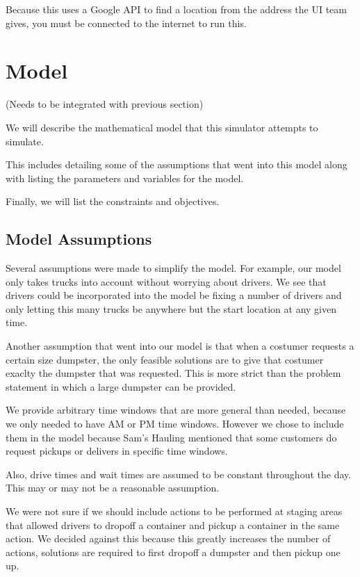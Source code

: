 \documentclass{article}
\begin{document}
Because this uses a Google API to find a location from the address the UI team gives, you must be connected to the internet to run this.

\section{Model}

(Needs to be integrated with previous section)


We will describe the mathematical model that this simulator attempts to simulate.

This includes detailing some of the assumptions that went into this model along with listing the parameters and variables for the model.

Finally, we will list the constraints and objectives.

\subsection{Model Assumptions}

Several assumptions were made to simplify the model.
For example, our model only takes trucks into account without worrying about drivers.
We see that drivers could be incorporated into the model be fixing a number of drivers and only letting this many trucks be anywhere but the start location at any given time.

Another assumption that went into our model is that when a costumer requests a certain size dumpster, the only feasible solutions are to give that costumer exaclty the dumpster that was requested.
This is more strict than the problem statement in which a large dumpster can be provided.

We provide arbitrary time windows that are more general than needed, because we only needed to have AM or PM time windows.
However we chose to include them in the model because Sam's Hauling mentioned that some customers do request pickups or delivers in specific time windows.

Also, drive times and wait times are assumed to be constant throughout the day.
This may or may not be a reasonable assumption.

We were not sure if we should include actions to be performed at staging areas that allowed drivers to dropoff a container and pickup a container in the same action.
We decided against this because this greatly increases the number of actions, solutions are required to first dropoff a dumpster and then pickup one up.
\end{document}
